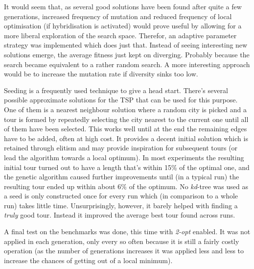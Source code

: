 

It would seem that, as several good solutions have been found after quite a few generations, increased frequency of mutation and reduced frequency of local optimisation (if hybridisation is activated) would prove useful by allowing for a more liberal exploration of the search space. Therefor, an adaptive parameter strategy was implemented which does just that. Instead of seeing interesting new solutions emerge, the average fitness just kept on diverging. Probably because the search became equivalent to a rather random search. A more interesting approach would be to increase the mutation rate if diversity sinks too low.


Seeding is a frequently used technique to give a head start. There's several possible approximate solutions for the TSP that can be used for this purpose. One of them is a nearest neighbour solution where a random city is picked and a tour is formed by repeatedly selecting the city nearest to the current one until all of them have been selected. This works well until at the end the remaining edges have to be added, often at high cost. It provides a decent initial solution which is retained through elitism and may provide inspiration for subsequent tours (or lead the algorithm towards a local optimum). In most experiments the resulting initial tour turned out to have a length that's within 15\% of the optimal one, and the genetic algorithm caused further improvements until (in a typical run) the resulting tour ended up within about 6\% of the optimum. No \textit{kd}-tree was used as a seed is only constructed once for every run which (in comparison to a whole run) takes little time. Unsurprisingly, however, it barely helped with finding a \textit{truly} good tour. Instead it improved the average best tour found across runs.


A final test on the benchmarks was done, this time with \textit{2-opt} enabled. It was not applied in each generation, only every so often because it is still a fairly costly operation (as the number of generations increases it was applied less and less to increase the chances of getting out of a local minimum).


